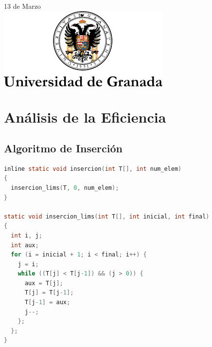 \begin{titlepage}

{\large 13 de Marzo}\\[2cm] %


\includegraphics{logo.png}\\[1cm] %
 

\vfill %

\end{titlepage}



\section{Análisis de la Eficiencia}


\subsection{Algoritmo de Inserción}
\begin{lstlisting}[language=C]
inline static void insercion(int T[], int num_elem)
{
  insercion_lims(T, 0, num_elem);
}

static void insercion_lims(int T[], int inicial, int final)
{
  int i, j;
  int aux;
  for (i = inicial + 1; i < final; i++) {
    j = i;
    while ((T[j] < T[j-1]) && (j > 0)) {
      aux = T[j];
      T[j] = T[j-1];
      T[j-1] = aux;
      j--;
    };
  };
}
\end{lstlisting}

